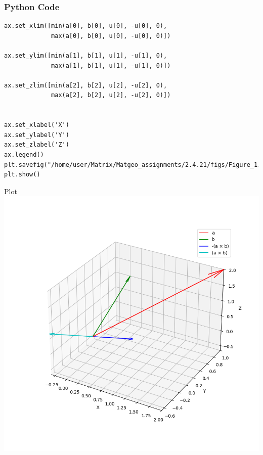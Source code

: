 \documentclass{beamer}
\begin{document}
\begin{frame}[fragile]
    \frametitle{Python Code}
    \begin{lstlisting}
ax.set_xlim([min(a[0], b[0], u[0], -u[0], 0),
             max(a[0], b[0], u[0], -u[0], 0)])

ax.set_ylim([min(a[1], b[1], u[1], -u[1], 0),
             max(a[1], b[1], u[1], -u[1], 0)])

ax.set_zlim([min(a[2], b[2], u[2], -u[2], 0),
             max(a[2], b[2], u[2], -u[2], 0)])


ax.set_xlabel('X')
ax.set_ylabel('Y')
ax.set_zlabel('Z')
ax.legend()
plt.savefig("/home/user/Matrix/Matgeo_assignments/2.4.21/figs/Figure_1.png")
plt.show()

    \end{lstlisting}
\end{frame}

\begin{frame}{Plot}
    \centering
    \includegraphics[width=\columnwidth, height=0.8\textheight, keepaspectratio]{figs/Figure_1.png}     
\end{frame}
\end{document}
